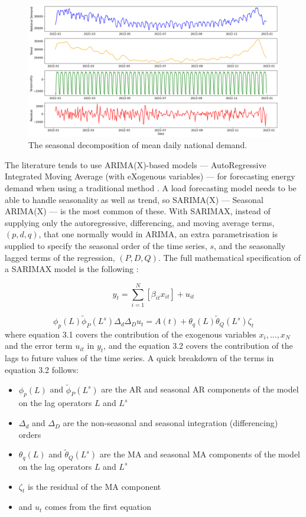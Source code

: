 \documentclass[12pt]{scrreprt}
\begin{document}
\begin{figure}[h!]
    \centering
    \includegraphics[scale=0.35]{Images/s_decomp_stlf.png}
    \caption{The seasonal decomposition of mean daily national demand.}
    \label{fig:s_decomp_stlf}
\end{figure}

The literature tends to use ARIMA(X)-based models --- AutoRegressive Integrated Moving Average (with eXogenous variables) --- for forecasting energy demand when using a traditional method \cite{Nti20}. A load forecasting model needs to be able to handle seasonality as well as trend, so SARIMA(X) --- Seasonal ARIMA(X) --- is the most common of these. With SARIMAX, instead of supplying only the autoregressive, differencing, and moving average terms, $(p,d,q)$, that one normally would in ARIMA, an extra parametrisation is supplied to specify the seasonal order of the time series, $s$, and the seasonally lagged terms of the regression, $(P,D,Q)$. The full mathematical specification of a SARIMAX model is the following \cite{Korstanje21}:

\begin{equation}
    y_t = \sum_{i=1}^{N}[\beta_{it} x_{it}] + u_{it}
\end{equation}

\begin{equation}
    \phi_p(L) \tilde{\phi}_P(L^s) \Delta_d \Delta_D u_t = A(t) + \theta_q(L) \tilde{\theta}_Q(L^s) \zeta_t
\end{equation}
where equation 3.1 covers the contribution of the exogenous variables $x_i, ..., x_N$ and the error term $u_{it}$ in $y_t$, and the equation 3.2 covers the contribution of the lags to future values of the time series. A quick breakdown of the terms in equation 3.2 follows:

\begin{itemize}
    \item $\phi_p(L)$ and $\tilde{\phi}_P(L^s)$ are the AR and seasonal AR components of the model on the lag operators $L$ and $L^s$
    \item $\Delta_d$ and $\Delta_D$ are the non-seasonal and seasonal integration (differencing) orders
    \item $\theta_q(L)$ and $\tilde{\theta}_Q(L^s)$ are the MA and seasonal MA components of the model on the lag operators $L$ and $L^s$
    \item $\zeta_t$ is the residual of the MA component
    \item and $u_t$ comes from the first equation
\end{itemize}
\end{document}
